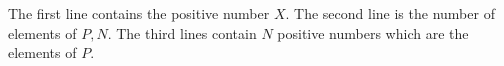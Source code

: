 The first line contains the positive number $X$. 
The second line is the number of elements of $P, N$. 
The third lines contain $N$ positive numbers which are the elements of $P$.
